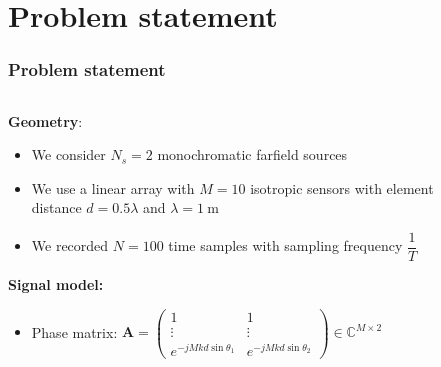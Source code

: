 \documentclass[UKenglish,8pt,aspectratio=1610]{beamer}
\begin{document}
	\section{Problem statement}
	\begin{frame}
		\frametitle{Problem statement \cite{twoDecades}}
			\begin{columns}
			\begin{column}{0.574\textwidth}
				\textbf{Geometry}:
				\begin{itemize}
					\item We consider $N_s=2$ monochromatic farfield sources  
					\item We use a linear array with $M=10$ isotropic sensors with element distance $d=0.5\lambda$ and $\lambda=1~\si{\meter}$
					\item We recorded $N=100$ time samples with sampling frequency $\dfrac{1}{T}$
				\end{itemize}
			\textbf{Signal model: }
				\begin{itemize}
					\item  Phase matrix: $\mathbf{A}=\begin{pmatrix}
						1&1\\
						\vdots&\vdots\\
						e^{-jMkd\sin\theta_1}&e^{-jMkd\sin\theta_2}
					\end{pmatrix}\in\mathbb{C}^{M\times 2}$
				\end{itemize}
			\end{column}
			\begin{column}{0.4\textwidth}
				\vspace{-25pt}
				\begin{figure}[h!]
\end{figure}
\end{column}
\end{columns}
\end{frame}
\end{document}
